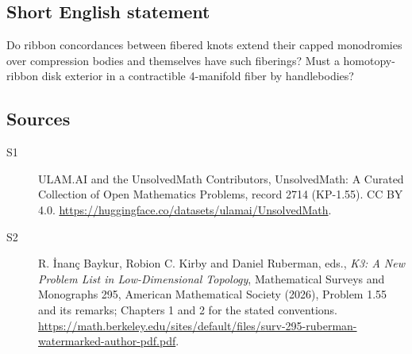 \documentclass[11pt]{article}
\begin{document}
\subsection{Short English statement}
Do ribbon concordances between fibered knots extend their capped monodromies over compression bodies and themselves have such fiberings? Must a homotopy-ribbon disk exterior in a contractible 4-manifold fiber by handlebodies?
\subsection{Sources}
\begin{description}
\item[\hypertarget{source:2714:1}{S1}] ULAM.AI and the UnsolvedMath Contributors, UnsolvedMath: A Curated Collection of Open Mathematics Problems, record 2714 (KP-1.55). CC BY 4.0. \url{https://huggingface.co/datasets/ulamai/UnsolvedMath}.
\item[\hypertarget{source:2714:2}{S2}] R. İnanç Baykur, Robion C. Kirby and Daniel Ruberman, eds., \emph{K3: A New Problem List in Low-Dimensional Topology}, Mathematical Surveys and Monographs 295, American Mathematical Society (2026), Problem 1.55 and its remarks; Chapters 1 and 2 for the stated conventions. \url{https://math.berkeley.edu/sites/default/files/surv-295-ruberman-watermarked-author-pdf.pdf}.
\end{description}
\label{end:2714}
\end{document}
